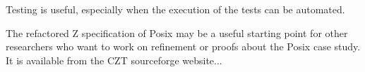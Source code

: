 \documentclass{llncs}
\begin{document}
Testing is useful, especially when the execution of the tests can
be automated.

The refactored Z specification of Posix may be a useful starting point
for other researchers who want to work on refinement or proofs
about the Posix case study.  It is available from the CZT sourceforge
website...


%
%


%
\end{document}
